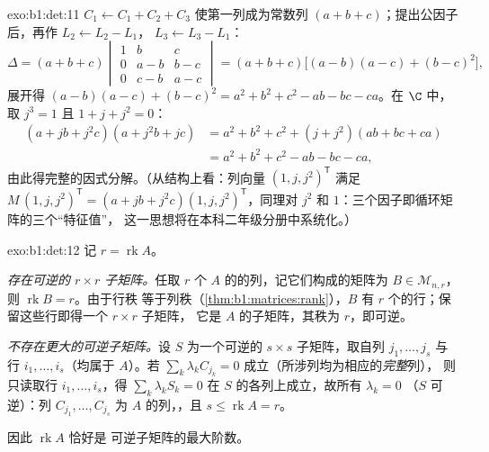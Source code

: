\begin{solution}{exo:b1:det:11}
$C_1 \leftarrow C_1 + C_2 + C_3$ 使第一列成为常数列
$(a + b + c)$；提出公因子后，再作 $L_2 \leftarrow L_2 - L_1$，
$L_3 \leftarrow L_3 - L_1$：
\[
\Delta = (a+b+c)\begin{vmatrix}
1 & b & c\\
0 & a - b & b - c\\
0 & c - b & a - c
\end{vmatrix}
= (a+b+c)\bigl[(a-b)(a-c) + (b-c)^2\bigr],
\]
展开得 $(a-b)(a-c) + (b-c)^2 = a^2 + b^2 + c^2 - ab - bc
- ca$。在 $\C$ 中，取 $j^3 = 1$ 且 $1 + j + j^2 = 0$：
\begin{align*}
(a + jb + j^2c)(a + j^2b + jc)
&= a^2 + b^2 + c^2 + (j + j^2)(ab + bc + ca)\\
&= a^2 + b^2 + c^2 - ab - bc - ca ,
\end{align*}
由此得完整的因式分解。（从结构上看：列向量
$(1, j, j^2)^{\mathsf T}$ 满足 $M\,(1, j, j^2)^{\mathsf T}
= (a + jb + j^2c)(1, j, j^2)^{\mathsf T}$，同理对
$j^2$ 和 $1$：三个因子即循环矩阵的三个“特征值”，
这一思想将在本科二年级分册中系统化。）
\end{solution}

\begin{solution}{exo:b1:det:12}
记 $r = \operatorname{rk} A$。

\emph{存在可逆的 $r \times r$ 子矩阵。}任取 $r$ 个
$A$ 的的列，记它们构成的矩阵为 $B \in \mathcal{M}_{n,r}$，
则 $\operatorname{rk} B = r$。由于行秩
等于列秩（\cref{thm:b1:matrices:rank}），$B$ 有 $r$
个的行；保留这些行即得一个 $r \times r$ 子矩阵，
它是 $A$ 的子矩阵，其秩为 $r$，即可逆。

\emph{不存在更大的可逆子矩阵。}设 $S$ 为一个可逆的 $s \times s$
子矩阵，取自列 $j_1, \dots, j_s$ 与行 $i_1,
\dots, i_s$（均属于 $A$）。若 $\sum_k \lambda_k
C_{j_k} = 0$ 成立（所涉列均为相应的\emph{完整}列），
则只读取行 $i_1, \dots, i_s$，得 $\sum_k
\lambda_k S_k = 0$ 在 $S$ 的各列上成立，故所有 $\lambda_k = 0$
（$S$ 可逆）：列 $C_{j_1}, \dots, C_{j_s}$
为 $A$ 的列，，且 $s \leq \operatorname{rk} A = r$。

因此 $\operatorname{rk} A$ 恰好是
可逆子矩阵的最大阶数。
\end{solution}

